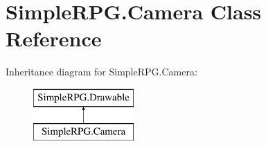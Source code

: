 \hypertarget{class_simple_r_p_g_1_1_camera}{\section{Simple\-R\-P\-G.\-Camera Class Reference}
\label{class_simple_r_p_g_1_1_camera}
}
Inheritance diagram for Simple\-R\-P\-G.\-Camera\-:\begin{figure}[H]
\begin{center}
\leavevmode
\includegraphics[height=2.000000cm]{class_simple_r_p_g_1_1_camera}
\end{center}
\end{figure}

